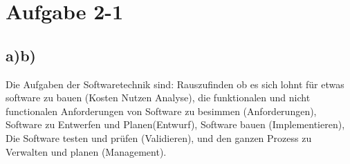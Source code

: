\chapter{Aufgabe 2-1}
\section{a)\-b)}
 Die Aufgaben der Softwaretechnik sind: Rauszufinden ob es sich lohnt für etwas software zu bauen (Kosten Nutzen Analyse), die funktionalen und nicht functionalen Anforderungen von Software zu besimmen (Anforderungen), Software zu Entwerfen und Planen(Entwurf), Software bauen (Implementieren), Die Software testen und prüfen (Validieren), und den ganzen Prozess zu Verwalten und planen (Management).
 
 